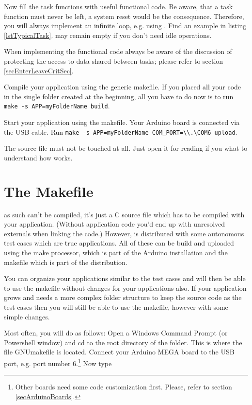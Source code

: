 Now fill the task functions with useful functional code. Be aware,
that a task function must never be left, a system reset would be the
consequence. Therefore, you will always implement an infinite loop, e.g.
using . Find an example in listing
\ref{lstTypicalTask}.  may remain empty if you don't need idle
operations.

When implementing the functional code always be aware of the discussion of
protecting the access to data shared between tasks; please refer to
section \ref{secEnterLeaveCritSec}.

Compile your application using the generic makefile. If you placed all
your code in the single folder created at the beginning, all you have to
do now is to run \verb+make -s APP=myFolderName build+.

Start your application using the makefile. Your Arduino board is connected
via the USB cable. Run 
\verb+make -s APP=myFolderName COM_PORT=\\.\COM6 upload+.

The \rtos{} source file  must not be touched at all. Just open
it for reading if you what to understand how \rtos{} works.


\section{The Makefile}
\label{secMakefile}

\rtos{} as such can't be compiled, it's just a C source file which has to
be compiled with your application. (Without application code you'd end up
with unresolved externals when linking the code.) However, \rtos{} is
distributed with some autonomous test cases which are true \rtos{}
applications. All of these can be build and uploaded using the make
processor, which is part of the Arduino installation and the makefile
which is part of the \rtos{} distribution.

You can organize your applications similar to the test cases and will then
be able to use the makefile without changes for your applications also. If
your application grows and needs a more complex folder structure to keep
the source code as the test cases then you will still be able to use the
makefile, however with some simple changes.

Most often, you will do as follows: Open a Windows Command Prompt (or
Powershell window) and cd to the root directory of the \rtos{} folder.
This is where the file GNUmakefile is located. Connect your Arduino MEGA
board to the USB port, e.g. port number 6.\footnote{Other boards need some
code customization first. Please, refer to section
\ref{secArduinoBoards}.} Now type

